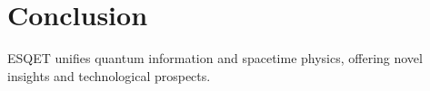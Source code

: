 \chapter{Conclusion}

ESQET unifies quantum information and spacetime physics, offering novel insights and technological prospects.
